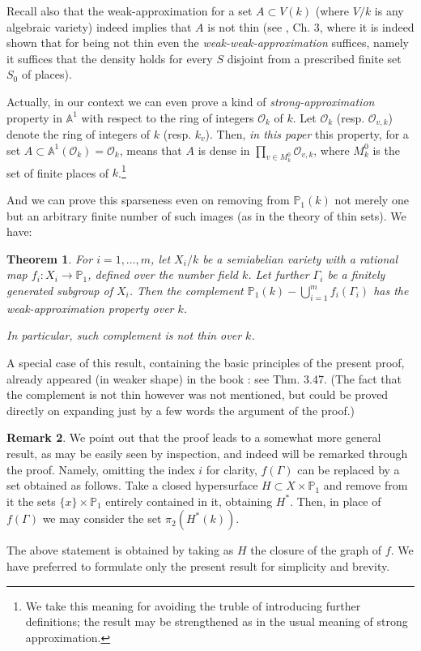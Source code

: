 \documentclass[leqno,12pt]{article} %
\def\A{{{\mathbb A}}}
\def\P{{{\mathbb P}}}
\def\O{{{\mathcal O}}}
\theoremstyle{plain} %
\newtheorem{theorem}{\indent\sc Theorem}[section]
\theoremstyle{definition} %
\newtheorem{remark}[theorem]{\indent\sc Remark}
\begin{document}
 Recall also that the weak-approximation for a set $A\subset V(k)$ (where $V/k$ is any algebraic variety) indeed  implies that $A$ is not thin (see \cite{S}, Ch. 3, where it is indeed  shown that for being not thin  even the {\it weak-weak-approximation} suffices, namely it suffices that  the density holds for every $S$ disjoint from a prescribed finite set $S_0$ of places). 

\medskip
 
 Actually, in our context  we can even prove a kind of  {\it strong-approximation} property in $\A^1$ with respect to the ring of integers $\O_k$ of $k$. Let $\O_k$ (resp. $\O_{v,k}$) denote the ring of integers of $k$ (resp. $k_v$). Then, {\it  in this paper} this property, for a set $A\subset \A^1(\O_k)=\O_k$, means that $A$ is dense in $\prod_{v\in M^0_{k}}\O_{v,k}$, where $M^0_{k}$ is the set of finite places of $k$.\footnote{We take this meaning for avoiding the truble of introducing further definitions; the result may be strengthened as in the usual meaning of strong approximation.}
 
And we can prove this sparseness even on removing from $\P_1(k)$ not merely one but an arbitrary  finite number of such  images (as in the theory of thin sets). We have:

\begin{theorem} \label{T.1} For $i=1,\ldots, m$, let $X_i/k$ be a semiabelian variety with a rational map  $f_i:X_i\to \P_1$,    defined over the number field $k$. Let further $\Gamma_i$ be a finitely generated subgroup of $X_i$. Then the complement $\P_1(k)-\bigcup_{i=1}^mf_i(\Gamma_i)$ has the weak-approximation property over $k$.

In particular, such complement is not thin over $k$.

 
\end{theorem}
 
 

 A special case of this result, containing the basic principles of the present proof, already appeared (in weaker shape)  in the book \cite{CZ-libro}: see Thm. 3.47. 
 (The fact that the complement is not thin however was not mentioned, but could be proved directly on expanding just by a few words the argument of the proof.)  
 
 \medskip
 
 
 \begin{remark} We point out that the proof leads to a somewhat more general result, as may be easily seen by inspection, and indeed will be remarked through the proof. Namely, omitting the index $i$ for clarity, $f(\Gamma)$ can be replaced by a set obtained as follows. Take a closed hypersurface $H\subset X\times \P_1$ and remove from it the sets $\{x\}\times \P_1$ entirely contained in it, obtaining $H^*$. Then, in place of $f(\Gamma)$ we may consider the set $\pi_2(H^*(k))$.  
 
 The above statement is obtained by taking as $H$ the closure of the graph of $f$. We have preferred to formulate only the present result for simplicity and brevity. 
 
 \end{remark}
 
\end{document}
